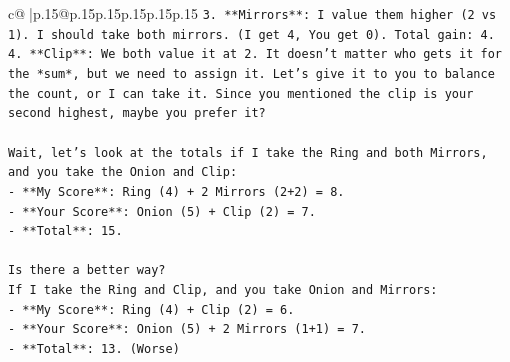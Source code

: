 \documentclass{article}
\begin{document}
{\begin{supertabular}{c@{$\;$}|p{.15\linewidth}@{}p{.15\linewidth}p{.15\linewidth}p{.15\linewidth}p{.15\linewidth}p{.15\linewidth}}
{{{\texttt{3. **Mirrors**: I value them higher (2 vs 1). I should take both mirrors. (I get 4, You get 0). Total gain: 4.} \\
\texttt{4. **Clip**: We both value it at 2. It doesn't matter who gets it for the *sum*, but we need to assign it. Let's give it to you to balance the count, or I can take it. Since you mentioned the clip is your second highest, maybe you prefer it?} \\
\\ 
\texttt{Wait, let's look at the totals if I take the Ring and both Mirrors, and you take the Onion and Clip:} \\
\texttt{{-} **My Score**: Ring (4) + 2 Mirrors (2+2) = 8.} \\
\texttt{{-} **Your Score**: Onion (5) + Clip (2) = 7.} \\
\texttt{{-} **Total**: 15.} \\
\\ 
\texttt{Is there a better way?} \\
\texttt{If I take the Ring and Clip, and you take Onion and Mirrors:} \\
\texttt{{-} **My Score**: Ring (4) + Clip (2) = 6.} \\
\texttt{{-} **Your Score**: Onion (5) + 2 Mirrors (1+1) = 7.} \\
\texttt{{-} **Total**: 13. (Worse)} \\
            }
        }
    }
     \\ \\


\end{supertabular}}
\end{document}
